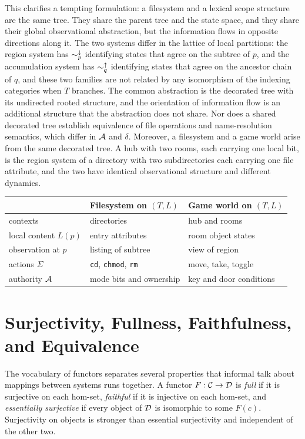 This clarifies a tempting formulation: a filesystem and a lexical scope structure are the same tree. They share the parent tree and the state space, and they share their global observational abstraction, but the information flows in opposite directions along it. The two systems differ in the lattice of local partitions: the region system has $\sim^{\downarrow}_p$ identifying states that agree on the subtree of $p$, and the accumulation system has $\sim^{\uparrow}_q$ identifying states that agree on the ancestor chain of $q$, and these two families are not related by any isomorphism of the indexing categories when $T$ branches. The common abstraction is the decorated tree with its undirected rooted structure, and the orientation of information flow is an additional structure that the abstraction does not share. Nor does a shared decorated tree establish equivalence of file operations and name-resolution semantics, which differ in $\mathcal A$ and $\delta$. Moreover, a filesystem and a game world arise from the same decorated tree. A hub with two rooms, each carrying one local bit, is the region system of a directory with two subdirectories each carrying one file attribute, and the two have identical observational structure and different dynamics.

\begin{center}
\begin{tabular}{lll}
\toprule
 & Filesystem on $(T,L)$ & Game world on $(T,L)$\\
\midrule
contexts & directories & hub and rooms\\
local content $L(p)$ & entry attributes & room object states\\
observation at $p$ & listing of subtree & view of region\\
actions $\Sigma$ & \texttt{cd}, \texttt{chmod}, \texttt{rm} & move, take, toggle\\
authority $\mathcal A$ & mode bits and ownership & key and door conditions\\
\bottomrule
\end{tabular}
\end{center}

\section{Surjectivity, Fullness, Faithfulness, and Equivalence}

The vocabulary of functors separates several properties that informal talk about mappings between systems runs together. A functor $F:\mathcal C\to\mathcal D$ is \emph{full} if it is surjective on each hom-set, \emph{faithful} if it is injective on each hom-set, and \emph{essentially surjective} if every object of $\mathcal D$ is isomorphic to some $F(c)$. Surjectivity on objects is stronger than essential surjectivity and independent of the other two.

